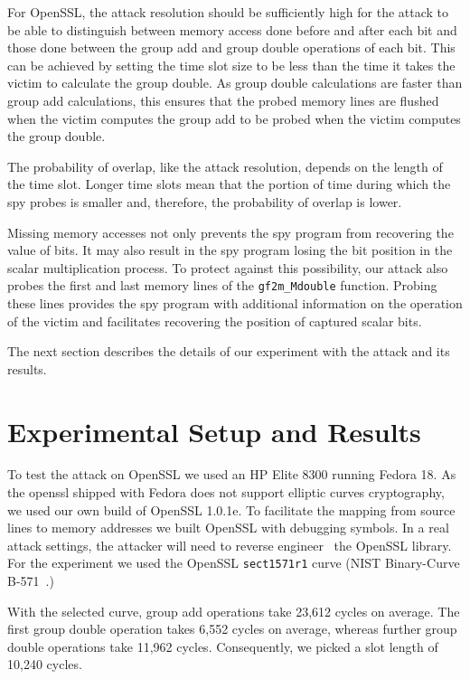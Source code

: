 \documentclass{llncs}
\begin{document}
For OpenSSL, the attack resolution should be sufficiently high for the attack to be able to distinguish between 
memory access done before and after each bit and those done between the group add and group double operations of each bit.
This can be achieved by setting the time slot size to be less than the time it takes the victim to calculate the group double.
As group double calculations are faster than group add calculations, this ensures that the probed memory lines are flushed
when the victim computes the group add to be probed when the victim computes the group double.

The probability of overlap, like the attack resolution, depends on the length of the time slot.
Longer time slots mean that the portion of time during which the spy probes is smaller and, therefore, 
the probability of overlap is lower.

Missing memory accesses not only prevents the spy program from recovering the value of bits.
It may also result in the spy program losing the bit position in the scalar multiplication process.
To protect against this possibility, our attack also probes the first and last memory lines of the 
\texttt{gf2m\_Mdouble} function.
Probing these lines provides the spy program with additional information on the operation of the victim
and facilitates recovering the position of captured scalar bits.



The next section describes the details of our experiment with the attack and its results.


\section{Experimental Setup and Results}\label{sec:results}

To test the attack on OpenSSL we used an HP Elite 8300 
running Fedora 18.
As the openssl shipped with Fedora does not support elliptic curves cryptography,
we used our own build of OpenSSL 1.0.1e. 
To facilitate the mapping from source lines to memory addresses we built OpenSSL with debugging symbols.
In a real attack settings, the attacker will need to reverse engineer~\cite{cipsero10software}
the OpenSSL library.
For the experiment we used the OpenSSL \texttt{sect1571r1} curve (NIST Binary-Curve B-571~\cite{fips}.)

With the selected curve, group add operations take 23,612 cycles on average.
The first group double operation takes 6,552 cycles on average, whereas further group double operations take 11,962 cycles.
Consequently, we picked a slot length of 10,240 cycles.
\end{document}

